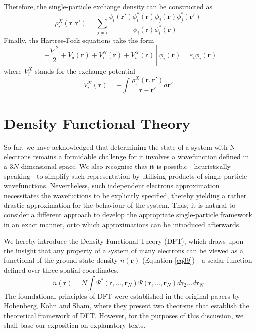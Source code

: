 Therefore, the single-particle exchange density can be constructed as 
\begin{equation}
  \label{eq36}
  \rho^X_i(\mathbf{r}, \mathbf{r'}) = \sum_{j\neq i}\frac{\phi_i(\mathbf{r'})\phi^*_i(\mathbf{r})\phi_j(\mathbf{r})\phi^*_j(\mathbf{r'})}{\phi_i(\mathbf{r})\phi^*_i(\mathbf{r})}
\end{equation}
Finally, the Hartree-Fock equations take the form 
\begin{equation}
  \label{eq37}
  \left[-\frac{\nabla^2}{2} + V_{\text{n}}(\mathbf{r}) + V^H_i(\mathbf{r}) + V^X_i(\mathbf{r})\right]\phi_i(\mathbf{r}) = \varepsilon_i \phi_i(\mathbf{r})
\end{equation}
where $V^X_i$ stands for the exchange potential
\begin{equation}
  \label{eq38}
  V^X_i(\mathbf{r}) = -\int \frac{\rho^X_i(\mathbf{r}, \mathbf{r'})}{|\mathbf{r} - \mathbf{r'}|} d\mathbf{r'}
\end{equation}

\section{Density Functional Theory}
So far, we have acknowledged that determining the state of a system with N electrons remains a formidable challenge for it involves a  wavefunction defined in a $3N$-dimensional space. We also recognise that it is possible---heuristically speaking---to simplify such representation by utilising products of single-particle wavefunctions. Nevertheless, such independent electrons approximation necessitates the wavefuctions to be explicitly specified, thereby yielding a rather drastic approximation for the behaviour of the system. Thus, it is natural to consider a different approach to develop the appropriate single-particle framework in an exact manner, onto which approximations can be introduced afterwards.

We hereby introduce the Density Functional Theory (DFT), which draws upon the insight that any property of a system of many electrons can be viewed as a functional of the ground-state density $n(\mathbf{r})$\supercite{martin2020electronic} (Equation \ref{eq39})---a scalar function defined over three spatial coordinates. 
\begin{equation}
  n(\mathbf{r}) = N \int \Psi^*(\mathbf{r}, \ldots, \mathbf{r}_N) \Psi(\mathbf{r},\ldots, \mathbf{r}_N) d\mathbf{r}_2 \ldots d\mathbf{r}_N
  \label{eq39}
\end{equation}
The foundational principles of DFT were established in the original papers by Hohenberg, Kohn and Sham\supercite{Hohenberg1964, Kohn1965}, where they present two theorems that establish the theoretical framework of DFT.
However, for the purposes of this discussion, we shall base our exposition on explanatory texts\supercite{martin2020electronic, giustino2014materials, kaxiras2003atomic, sholl2023density}.


